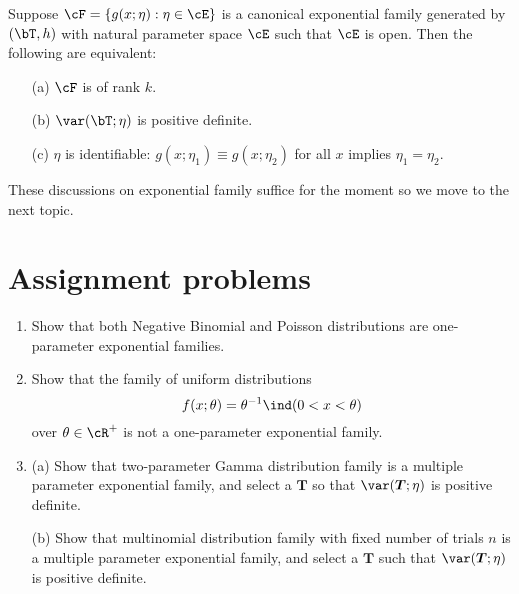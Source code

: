 \begin{theorem}
Suppose $\cF = \{g(x; \eta): \eta \in \cE \}$ is a canonical
exponential family generated by $(\bT, h)$ with natural
parameter space $\cE$ such that $\cE$ is open.
Then the following are equivalent:
\begin{itemize}
\item
[(a)] $\cF$ is of rank $k$.

\item
[(b)] $\var(\bT; \eta)$ is positive definite.

\item
[(c)] $\eta$ is identifiable: $g(x; \eta_1) \equiv g(x; \eta_2)$
for all $x$ implies $\eta_1 = \eta_2$.
\end{itemize}
\end{theorem}

These discussions on exponential family suffice for the moment
so we move to the next topic.

\section{Assignment problems}

\begin{enumerate}
\item
Show that both Negative Binomial and Poisson distributions 
are one-parameter exponential families. 

\item
Show that the family of uniform distributions
\[
f(x; \theta) = \theta^{-1} \ind(0 < x < \theta)
\]
over $\theta \in \cR^+$ is not a one-parameter exponential family.

\item
(a) Show that two-parameter Gamma distribution family is a multiple parameter exponential family, 
and select a $ \boldsymbol{T} $ so that $ \var (\boldsymbol{T}; \eta) $ is positive definite. 

(b) Show that multinomial distribution family with fixed number of trials 
$ n $ is a multiple parameter exponential family, 
and select a $ \boldsymbol{T} $ such that $ \var (\boldsymbol{T}; \eta) $ is positive definite.
\end{enumerate}

